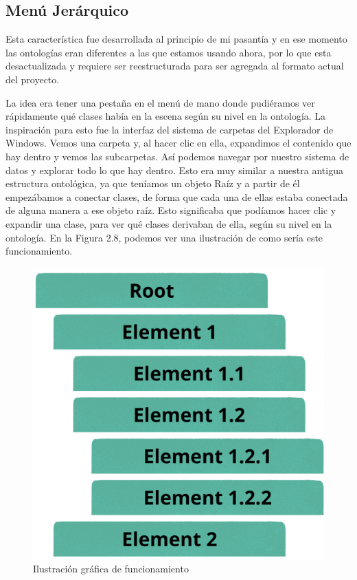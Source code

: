 \subsection{Menú Jerárquico}

Esta característica fue desarrollada al principio de mi pasantía y en ese momento las ontologías eran diferentes a las que estamos usando ahora, por lo que esta desactualizada y requiere ser reestructurada para ser agregada al formato actual del proyecto.

La idea era tener una pestaña en el menú de mano donde pudiéramos ver rápidamente qué clases había en la escena según su nivel en la ontología. La inspiración para esto fue la interfaz del sistema de carpetas del Explorador de Windows. Vemos una carpeta y, al hacer clic en ella, expandimos el contenido que hay dentro y vemos las subcarpetas.
Así podemos navegar por nuestro sistema de datos y explorar todo lo que hay dentro. Esto era muy similar a nuestra antigua estructura ontológica, ya que teníamos un objeto Raíz y a partir de él empezábamos a conectar clases, de forma que cada una de ellas estaba conectada de alguna manera a ese objeto raíz.
Esto significaba que podíamos hacer clic y expandir una clase, para ver qué clases derivaban de ella, según su nivel en la ontología. En la Figura 2.8, podemos ver una ilustración de como sería este funcionamiento.

\begin{figure}[ht]
   \begin{center}
      \includegraphics[width=0.6\linewidth]{chapter2/figures/hierarchy.png}
   \end{center}
   \caption[Ilustración gráfica de funcionamiento]
   {\footnotesize Ilustración gráfica de funcionamiento}
   \label{fig:mufigure11}
\end{figure}

